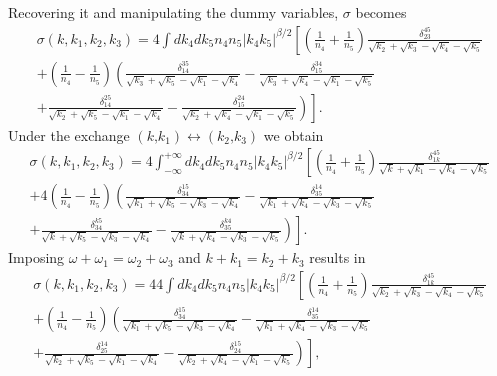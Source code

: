     Recovering it and manipulating the dummy variables, 
    $\sigma$ becomes
    \begin{multline}
      \sigma(k,k_1,k_2,k_3) =  4 \int dk_4dk_5n_4n_5|k_4k_5|^{\beta/2} 
       \left[\left( \frac{1}{n_4}+\frac{1}{n_5} \right) 
      \frac{\delta_{23}^{45}}{\sqrt{k_2}+\sqrt{k_3}-\sqrt{k_4}-\sqrt{k_5}} \right. \\
      + \left( \frac{1}{n_4}-\frac{1}{n_5} \right) \left(\frac{\delta_{14}^{35}}{\sqrt{k_3}+\sqrt{k_5}-\sqrt{k_1}-\sqrt{k_4}} - \frac{\delta_{15}^{34}}{\sqrt{k_3} 
       +\sqrt{k_4}-\sqrt{k_1}-\sqrt{k_5}}  \right. \\
      \left. \left. +\frac{\delta_{14}^{25}}{\sqrt{k_2}+\sqrt{k_5}-\sqrt{k_1}-\sqrt{k_4}} -\frac{\delta_{15}^{24}}{\sqrt{k_2}
      +\sqrt{k_4}-\sqrt{k_1}-\sqrt{k_5}}\right)\right].
      \label{eqsym}
    \end{multline}
    Under the exchange $(k \text{,} k_1) \leftrightarrow (k_2 \text{,} k_3)$  we obtain
    \begin{multline*}
      \sigma(k,k_1,k_2,k_3) =  4 \int_{-\infty}^{+\infty}dk_4dk_5n_4n_5|k_4k_5|^{\beta/2} 
       \left[\left( \frac{1}{n_4}+\frac{1}{n_5} \right) 
      \frac{\delta_{1k}^{45}}{\sqrt{k}+\sqrt{k_1}-\sqrt{k_4}-\sqrt{k_5}} \right. \\
      + 4\left( \frac{1}{n_4}-\frac{1}{n_5} \right) 
      \left(\frac{\delta_{34}^{15}}{\sqrt{k_1}+\sqrt{k_5}-\sqrt{k_3}-\sqrt{k_4}} - \frac{\delta_{35}^{14}}{\sqrt{k_1} +\sqrt{k_4}-\sqrt{k_3}-\sqrt{k_5}}  \right. \\
      \left. \left. +\frac{\delta_{34}^{k5}}{\sqrt{k}+\sqrt{k_5}-\sqrt{k_3}-\sqrt{k_4}} -\frac{\delta_{35}^{k4}}{\sqrt{k}+\sqrt{k_4}-\sqrt{k_3}-\sqrt{k_5}}\right)\right].
    \end{multline*}
    Imposing $\omega + \omega_1 = \omega_2 +\omega_3$ and $k + k_1 = k_2 + k_3$ results in
    \begin{multline*}
      \sigma(k,k_1,k_2,k_3) =  44 \int dk_4dk_5n_4n_5|k_4k_5|^{\beta/2} 
       \left[\left( \frac{1}{n_4}+\frac{1}{n_5} \right) 
      \frac{\delta_{1k}^{45}}{\sqrt{k_2}+\sqrt{k_3}-\sqrt{k_4}-\sqrt{k_5}} \right. \\
      + \left( \frac{1}{n_4}-\frac{1}{n_5} \right) 
      \left(\frac{\delta_{34}^{15}}{\sqrt{k_1}+\sqrt{k_5}-\sqrt{k_3}-\sqrt{k_4}} - \frac{\delta_{35}^{14}}{\sqrt{k_1} +\sqrt{k_4}-\sqrt{k_3}-\sqrt{k_5}}  \right. \\
      \left. \left. +\frac{\delta_{25}^{14}}{\sqrt{k_2}+\sqrt{k_5}-\sqrt{k_1}-\sqrt{k_4}} -\frac{\delta_{24}^{15}}{\sqrt{k_2}+\sqrt{k_4}-\sqrt{k_1}-\sqrt{k_5}}\right)\right],
    \end{multline*}
